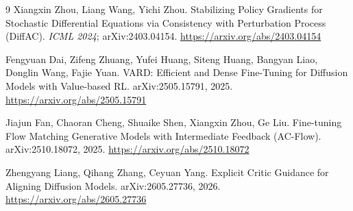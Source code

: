 \documentclass[11pt]{article}
\theoremstyle{remark}
\begin{document}
\begin{thebibliography}{9}
Xiangxin Zhou, Liang Wang, Yichi Zhou.
\newblock Stabilizing Policy Gradients for Stochastic Differential Equations via
Consistency with Perturbation Process (DiffAC).
\newblock \emph{ICML 2024}; arXiv:2403.04154. \url{https://arxiv.org/abs/2403.04154}

Fengyuan Dai, Zifeng Zhuang, Yufei Huang, Siteng Huang, Bangyan Liao, Donglin Wang,
Fajie Yuan.
\newblock VARD: Efficient and Dense Fine-Tuning for Diffusion Models with Value-based RL.
\newblock arXiv:2505.15791, 2025. \url{https://arxiv.org/abs/2505.15791}

Jiajun Fan, Chaoran Cheng, Shuaike Shen, Xiangxin Zhou, Ge Liu.
\newblock Fine-tuning Flow Matching Generative Models with Intermediate Feedback
(AC-Flow).
\newblock arXiv:2510.18072, 2025. \url{https://arxiv.org/abs/2510.18072}

Zhengyang Liang, Qihang Zhang, Ceyuan Yang.
\newblock Explicit Critic Guidance for Aligning Diffusion Models.
\newblock arXiv:2605.27736, 2026. \url{https://arxiv.org/abs/2605.27736}
\end{thebibliography}
\end{document}
